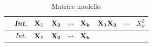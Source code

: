 \documentclass[
  11pt,
]{book}
\begin{document}
\begin{longtable}[]{@{}ccccccccc@{}}
\caption{\label{tab:MatrModCCD} Matrice modello}\tabularnewline
\toprule
\begin{minipage}[b]{0.09\columnwidth}\centering
\strut
\end{minipage} & \begin{minipage}[b]{0.06\columnwidth}\centering
\emph{Int.}\strut
\end{minipage} & \begin{minipage}[b]{0.09\columnwidth}\centering
\(\bf{X_1}\)\strut
\end{minipage} & \begin{minipage}[b]{0.09\columnwidth}\centering
\(\bf{X_2}\)\strut
\end{minipage} & \begin{minipage}[b]{0.08\columnwidth}\centering
\(\cdots\)\strut
\end{minipage} & \begin{minipage}[b]{0.09\columnwidth}\centering
\(\bf{X_k}\)\strut
\end{minipage} & \begin{minipage}[b]{0.11\columnwidth}\centering
\(\bf{X_1X_2}\)\strut
\end{minipage} & \begin{minipage}[b]{0.08\columnwidth}\centering
\(\cdots\)\strut
\end{minipage} & \begin{minipage}[b]{0.08\columnwidth}\centering
\(X^2_k\)\strut
\end{minipage}\tabularnewline
\midrule
\endfirsthead
\toprule
\begin{minipage}[b]{0.09\columnwidth}\centering
\strut
\end{minipage} & \begin{minipage}[b]{0.06\columnwidth}\centering
\emph{Int.}\strut
\end{minipage} & \begin{minipage}[b]{0.09\columnwidth}\centering
\(\bf{X_1}\)\strut
\end{minipage} & \begin{minipage}[b]{0.09\columnwidth}\centering
\(\bf{X_2}\)\strut
\end{minipage} & \begin{minipage}[b]{0.08\columnwidth}\centering
\(\cdots\)\strut
\end{minipage} & \begin{minipage}[b]{0.09\columnwidth}\centering
\(\bf{X_k}\)\strut
\end{minipage} & \begin{minipage}[b]{0.11\columnwidth}\centering

\end{minipage}
\end{longtable}
\end{document}
